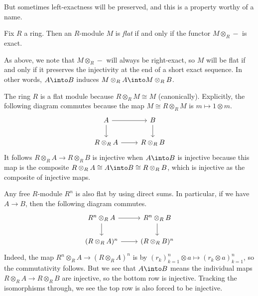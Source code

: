 But sometimes left-exactness will be preserved, and this is a property worthy of a name.
\begin{definition}[Flat]
	Fix $R$ a ring. Then an $R$-module $M$ is \textit{flat} if and only if the functor $M\otimes_R-$ is exact.
\end{definition}
\begin{remark}
	As above, we note that $M\otimes_R-$ will always be right-exact, so $M$ will be flat if and only if it preserves the injectivity at the end of a short exact sequence. In other words, $A\into B$ induces $M\otimes_RA\into M\otimes_RB$.
\end{remark}
\begin{example}
	The ring $R$ is a flat module because $R\otimes_RM\cong M$ (canonically). Explicitly, the following diagram commutes because the map $M\cong R\otimes_RM$ is $m\mapsto1\otimes m$.
	\[\begin{tikzcd}
		A & B \\
		{R\otimes_RA} & {R\otimes_RB}
		\arrow[from=1-1, to=1-2]
		\arrow[from=2-1, to=2-2]
		\arrow[from=1-1, to=2-1]
		\arrow[from=1-2, to=2-2]
	\end{tikzcd}\]
	It follows $R\otimes_RA\to R\otimes_RB$ is injective when $A\into B$ is injective because this map is the composite $R\otimes_RA\cong A\into B\cong R\otimes_RB$, which is injective as the composite of injective maps.
\end{example}
\begin{example}
	Any free $R$-module $R^n$ is also flat by using direct sums. In particular, if we have $A\to B$, then the following diagram commutes.
	\[\begin{tikzcd}
		{R^n\otimes_RA} & {R^n\otimes_RB} \\
		{(R\otimes_R A)^n} & {(R\otimes_R B)^n}
		\arrow[from=1-1, to=1-2]
		\arrow[from=2-1, to=2-2]
		\arrow[from=1-1, to=2-1]
		\arrow[from=1-2, to=2-2]
	\end{tikzcd}\]
	Indeed, the map $R^n\otimes_R A\to(R\otimes_R A)^n$ is by $(r_k)_{k=1}^n\otimes a\mapsto(r_k\otimes a)_{k=1}^n$, so the commutativity follows. But we see that $A\into B$ means the individual maps $R\otimes_RA\to R\otimes_RB$ are injective, so the bottom row is injective. Tracking the isomorphisms through, we see the top row is also forced to be injective.
\end{example}


